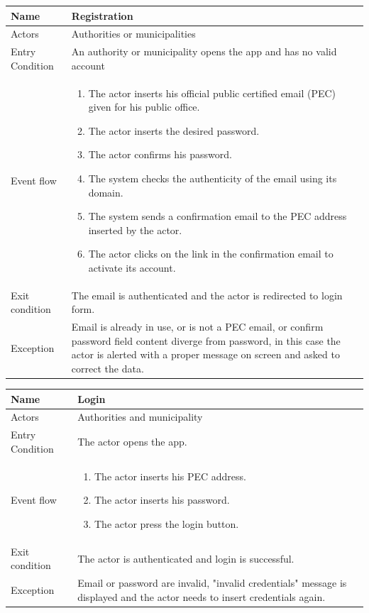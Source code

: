 \vskip 0.2in
\begin{tabular}{|p{3.1cm}|p{11.6cm}|}
\hline
Name & Registration\\
\hline
Actors & Authorities or municipalities\\
\hline
Entry Condition & An authority or municipality opens the app and has no valid account\\
\hline
Event flow & \begin{enumerate}
                \item The actor inserts his official public certified email (PEC) given for his public office.
                \item The actor inserts the desired password.
                \item The actor confirms his password.
                \item The system checks the authenticity of the email using its domain.
                \item The system sends a confirmation email to the PEC address inserted by the actor.
                \item The actor clicks on the link in the confirmation email to activate its account.
            \end{enumerate}\\
\hline
Exit condition & The email is authenticated and the actor is redirected to login form.\\
\hline
Exception & Email is already in use, or is not a PEC email, or confirm password field content diverge from password, in this case the actor is alerted with a proper message on screen and asked to correct the data.\\
\hline
\end{tabular}

\vskip 0.2in
\begin{tabular}{|p{3.1cm}|p{11.6cm}|}
\hline
Name & Login\\
\hline
Actors & Authorities and municipality\\
\hline
Entry Condition & The actor opens the app.\\
\hline
Event flow & \begin{enumerate}
                \item The actor inserts his PEC address.
                \item The actor inserts his password.
                \item The actor press the login button.
            \end{enumerate}\\
\hline
Exit condition & The actor is authenticated and login is successful.\\
\hline
Exception & Email or password are invalid, "invalid credentials" message is displayed and the actor needs to insert credentials again.\\
\hline
\end{tabular}

